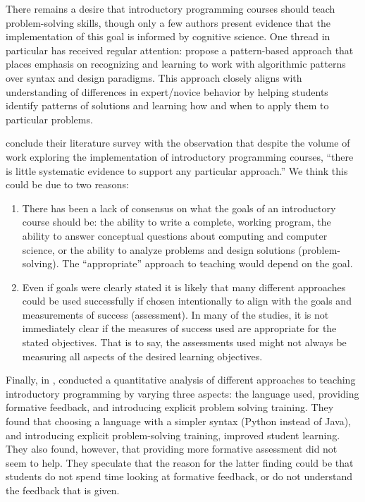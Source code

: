 \documentclass[12pt]{article}
\begin{document}
There remains a desire that introductory programming courses should
teach problem-solving skills, though only a few authors present
evidence that the implementation of this goal is informed by cognitive
science\autocite{kramarski_cognitivemetacognitive_1997,reed_incorporating_1998,muller_supporting_2008}. One
thread in particular has received regular attention:
\citeauthor{east_patternbased_1996} propose a pattern-based approach
that places emphasis on recognizing and learning to work with
algorithmic patterns over syntax and design
paradigms\autocite{east_patternbased_1996}. This approach closely
aligns with understanding of differences in expert/novice behavior by
helping students identify patterns of solutions and learning how and
when to apply them to particular
problems\autocite{east_patternbased_1996,muller_pattern_2005,wallingford_first_1996,reed_incorporating_1998}.

\citeauthor{pears_survey_2007-1} conclude their
\citeyear{pears_survey_2007-1} literature survey with the observation
that despite the volume of work exploring the implementation of
introductory programming courses, ``there is little systematic evidence
to support any particular approach.''\autocite{pears_survey_2007-1}
We think this could be due to two reasons:

\begin{enumerate}
\item There has been a lack of consensus on what the goals of an
  introductory course should be: the ability to write a complete,
  working program, the ability to answer conceptual questions about
  computing and computer science, or the ability to analyze problems
  and design solutions (problem-solving). The ``appropriate'' approach
  to teaching would depend on the goal.

\item Even if goals were clearly stated it is likely that many
  different approaches could be used successfully if chosen
  intentionally to align with the goals and measurements of success
  (assessment). In many of the studies, it is not immediately clear if
  the measures of success used are appropriate for the stated
  objectives. That is to say, the assessments used might not always be
  measuring all aspects of the desired learning objectives.
\end{enumerate}

Finally, in \citeyear{koulouri_teaching_2014},
\citeauthor{koulouri_teaching_2014} conducted a quantitative analysis
of different approaches to teaching introductory programming by
varying three aspects: the language used, providing formative
feedback, and introducing explicit problem solving
training\autocite{koulouri_teaching_2014}. They found that choosing a
language with a simpler syntax (Python instead of Java), and
introducing explicit problem-solving training, improved student
learning. They also found, however, that providing more formative
assessment did not seem to help. They speculate that the reason for
the latter finding could be that students do not spend time looking at
formative feedback, or do not understand the feedback that is given.
\end{document}
